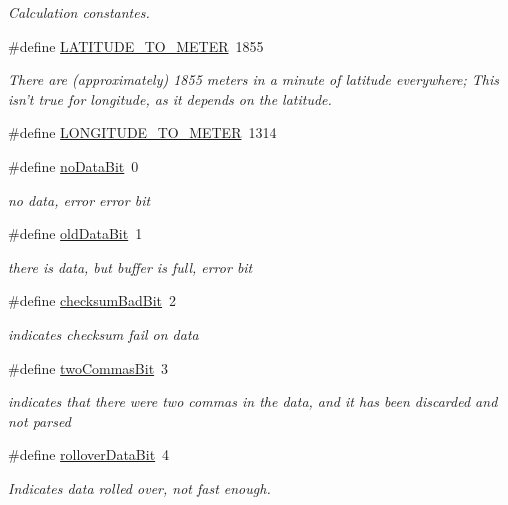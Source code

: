 \begin{DoxyCompactItemize}
\begin{DoxyCompactList}\small\item\em \-Calculation constantes. \end{DoxyCompactList}\item 
\#define \hyperlink{group__globalconstants_ga334339ea1bc712a2689665192c02bfad}{\-L\-A\-T\-I\-T\-U\-D\-E\-\_\-\-T\-O\-\_\-\-M\-E\-T\-E\-R}~1855
\begin{DoxyCompactList}\small\item\em \-There are (approximately) 1855 meters in a minute of latitude everywhere; \-This isn't true for longitude, as it depends on the latitude. \end{DoxyCompactList}\item 
\#define \hyperlink{group__globalconstants_ga5944046f3cb8cd99f5f71c1327ef8bc7}{\-L\-O\-N\-G\-I\-T\-U\-D\-E\-\_\-\-T\-O\-\_\-\-M\-E\-T\-E\-R}~1314
\item 
\#define \hyperlink{group__globalconstants_ga1bc4f63dcd0b30d09b7e320d0595695c}{no\-Data\-Bit}~0
\begin{DoxyCompactList}\small\item\em no data, error error bit \end{DoxyCompactList}\item 
\#define \hyperlink{group__globalconstants_gaed67540d9d2621c3a21a0f6eb8b75d01}{old\-Data\-Bit}~1
\begin{DoxyCompactList}\small\item\em there is data, but buffer is full, error bit \end{DoxyCompactList}\item 
\#define \hyperlink{group__globalconstants_gacd110736362ec97d7349dd67b527df39}{checksum\-Bad\-Bit}~2
\begin{DoxyCompactList}\small\item\em indicates checksum fail on data \end{DoxyCompactList}\item 
\#define \hyperlink{group__globalconstants_gae059b25098726f37143284774ef86a07}{two\-Commas\-Bit}~3
\begin{DoxyCompactList}\small\item\em indicates that there were two commas in the data, and it has been discarded and not parsed \end{DoxyCompactList}\item 
\#define \hyperlink{group__globalconstants_ga72f54d1e0beda470c8361ba984148900}{rollover\-Data\-Bit}~4
\begin{DoxyCompactList}\small\item\em \-Indicates data rolled over, not fast enough. \end{DoxyCompactList}\item 

\end{DoxyCompactItemize}
